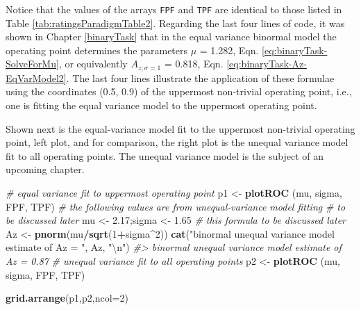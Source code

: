 \documentclass[
]{book}
\newenvironment{Shaded}{\begin{snugshade}}{\end{snugshade}}
\newcommand{\CharTok}[1]{\textcolor[rgb]{0.31,0.60,0.02}{#1}}
\newcommand{\CommentTok}[1]{\textcolor[rgb]{0.56,0.35,0.01}{\textit{#1}}}
\newcommand{\DataTypeTok}[1]{\textcolor[rgb]{0.13,0.29,0.53}{#1}}
\newcommand{\DecValTok}[1]{\textcolor[rgb]{0.00,0.00,0.81}{#1}}
\newcommand{\FloatTok}[1]{\textcolor[rgb]{0.00,0.00,0.81}{#1}}
\newcommand{\KeywordTok}[1]{\textcolor[rgb]{0.13,0.29,0.53}{\textbf{#1}}}
\newcommand{\NormalTok}[1]{#1}
\newcommand{\OperatorTok}[1]{\textcolor[rgb]{0.81,0.36,0.00}{\textbf{#1}}}
\newcommand{\StringTok}[1]{\textcolor[rgb]{0.31,0.60,0.02}{#1}}
\begin{document}
Notice that the values of the arrays \texttt{FPF} and \texttt{TPF} are identical to those listed in Table \ref{tab:ratingsParadigmTable2}. Regarding the last four lines of code, it was shown in Chapter \ref{binaryTask} that in the equal variance binormal model the operating point determines the parameters \(\mu\) = 1.282, Eqn. \eqref{eq:binaryTask-SolveForMu}, or equivalently \(A_{z;\sigma = 1}\) = 0.818, Eqn. \eqref{eq:binaryTask-Az-EqVarModel2}. The last four lines illustrate the application of these formulae using the coordinates (0.5, 0.9) of the uppermost non-trivial operating point, i.e., one is fitting the equal variance model to the uppermost operating point.

Shown next is the equal-variance model fit to the uppermost non-trivial operating point, left plot, and for comparison, the right plot is the unequal variance model fit to all operating points. The unequal variance model is the subject of an upcoming chapter.

\begin{Shaded}
\begin{Highlighting}[]
\CommentTok{\# equal variance fit to uppermost operating point}
\NormalTok{p1 \textless{}{-}}\StringTok{ }\KeywordTok{plotROC}\NormalTok{ (mu, sigma, FPF, TPF)}
\CommentTok{\# the following values are from unequal{-}variance model fitting}
\CommentTok{\# to be discussed later}
\NormalTok{mu \textless{}{-}}\StringTok{ }\FloatTok{2.17}\NormalTok{;sigma \textless{}{-}}\StringTok{ }\FloatTok{1.65}
\CommentTok{\# this formula to be discussed later}
\NormalTok{Az \textless{}{-}}\StringTok{ }\KeywordTok{pnorm}\NormalTok{(mu}\OperatorTok{/}\KeywordTok{sqrt}\NormalTok{(}\DecValTok{1}\OperatorTok{+}\NormalTok{sigma}\OperatorTok{\^{}}\DecValTok{2}\NormalTok{))}
\KeywordTok{cat}\NormalTok{(}\StringTok{"binormal unequal variance model estimate of Az = "}\NormalTok{, Az, }\StringTok{"}\CharTok{\textbackslash{}n}\StringTok{"}\NormalTok{)}
\CommentTok{\#\textgreater{} binormal unequal variance model estimate of Az =  0.87}
\CommentTok{\# unequal variance fit to all operating points}
\NormalTok{p2 \textless{}{-}}\StringTok{ }\KeywordTok{plotROC}\NormalTok{ (mu, sigma, FPF, TPF)}
\end{Highlighting}
\end{Shaded}

\begin{Shaded}
\begin{Highlighting}[]
\KeywordTok{grid.arrange}\NormalTok{(p1,p2,}\DataTypeTok{ncol=}\DecValTok{2}\NormalTok{)}
\end{Highlighting}
\end{Shaded}
\end{document}
